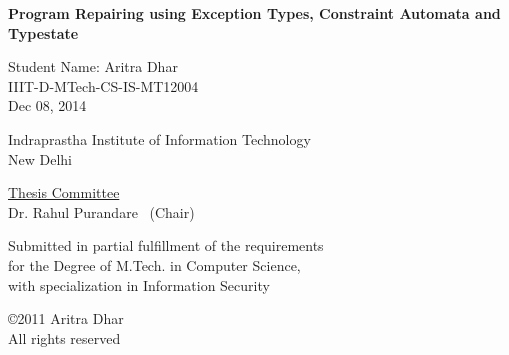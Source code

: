 

\def\addrone{IIIT-Delhi, Okhla Phase 3}
\def\addrtwo{New Delhi, India}

\def\degree{M.Tech. in Computer Science with Specialization in Information Security}


\def\submissiondate{December 08, 2014}

\def\supervisorone{Dr. Rahul Purandare}


%
%
%
%
%
%

\thispagestyle{empty}

\begin{center}

{\LARGE \bf {Program Repairing using Exception Types, Constraint Automata and Typestate}

 }  
 \vspace{.3in}
 
 {\Large{Student Name: Aritra Dhar}} \\  
 \vspace{.1in} 
 IIIT-D-MTech-CS-IS-MT12004 \\

 Dec 08, 2014 \\
  
    \vspace{.35in}

  \vspace{.25in}

{Indraprastha Institute of Information Technology\\
New Delhi}

\vspace{.35in}  {\underline{Thesis Committee}} \\ \supervisorone               
~(Chair)
  \\ \vspace{.35in}


 {Submitted in partial fulfillment of the requirements \\for the Degree of M.Tech. in Computer Science, \\ with specialization in Information Security}

\vspace{.2in}

\copyright 2011 Aritra Dhar \\ All rights reserved \\
\vspace{.8in}


\end{center}


